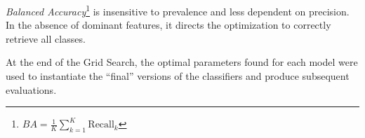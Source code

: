 \vspace{2mm}

\textit{Balanced Accuracy}\footnote{$BA = \frac{1}{K} \sum_{k=1}^{K} \text{Recall}_k$} is insensitive to prevalence and less dependent on precision. In the absence of dominant features, it directs the optimization to correctly retrieve all classes.

\vspace{2mm}

At the end of the Grid Search, the optimal parameters found for each model were used to instantiate the “final” versions of the classifiers and produce subsequent evaluations. 

\newpage

